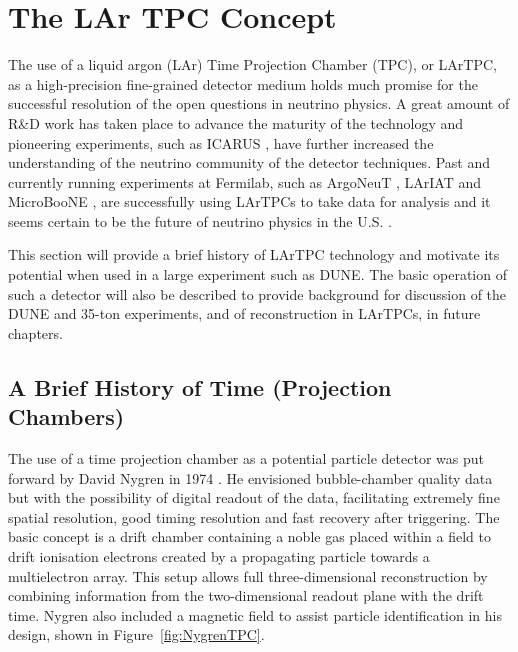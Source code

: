 \section{The LAr TPC Concept}\label{sec:LArTPC}

The use of a liquid argon (LAr) Time Projection Chamber (TPC), or LArTPC, as a high-precision fine-grained detector medium holds much promise for the successful resolution of the open questions in neutrino physics.  A great amount of R\&D work has taken place to advance the maturity of the technology and pioneering experiments, such as ICARUS \cite{ICARUS2004}, have further increased the understanding of the neutrino community of the detector techniques.  Past and currently running experiments at Fermilab, such as ArgoNeuT \cite{ArgoNeuT2012}, LArIAT \cite{LArIAT2014} and MicroBooNE \cite{MicroBooNE2017}, are successfully using LArTPCs to take data for analysis and it seems certain to be the future of neutrino physics in the U.S. \cite{Baller2014}.

This section will provide a brief history of LArTPC technology and motivate its potential when used in a large experiment such as DUNE.  The basic operation of such a detector will also be described to provide background for discussion of the DUNE and 35-ton experiments, and of reconstruction in LArTPCs, in future chapters.

\subsection{A Brief History of Time (Projection Chambers)}\label{sec:LArTPCHistory}

The use of a time projection chamber as a potential particle detector was put forward by David Nygren in 1974 \cite{Nygren1974}.  He envisioned bubble-chamber quality data but with the possibility of digital readout of the data, facilitating extremely fine spatial resolution, good timing resolution and fast recovery after triggering.  The basic concept is a drift chamber containing a noble gas placed within a field to drift ionisation electrons created by a propagating particle towards a multielectron array.  This setup allows full three-dimensional reconstruction by combining information from the two-dimensional readout plane with the drift time.  Nygren also included a magnetic field to assist particle identification in his design, shown in Figure~\ref{fig:NygrenTPC}.

